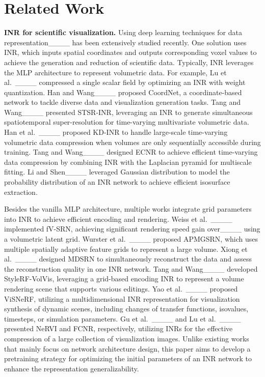 \section{Related Work}
\vspace{-0.025in}

{\bf INR for scientific visualization.}
Using deep learning techniques for data representation____ has been extensively studied recently. 
One solution uses INR, which inputs spatial coordinates and outputs corresponding voxel values to achieve the generation and reduction of scientific data. 
Typically, INR leverages the MLP architecture to represent volumetric data.
For example, Lu et al.\ ____ compressed a single scalar field by optimizing an INR with weight quantization.
Han and Wang____ proposed CoordNet, a coordinate-based network to tackle diverse data and visualization generation tasks.
Tang and Wang____ presented STSR-INR, leveraging an INR to generate simultaneous spatiotemporal super-resolution for time-varying multivariate volumetric data.
Han et al.\ ____ proposed KD-INR to handle large-scale time-varying volumetric data compression when volumes are only sequentially accessible during training.
Tang and Wang____ designed ECNR to achieve efficient time-varying data compression by combining INR with the Laplacian pyramid for multiscale fitting.
Li and Shen____ leveraged Gaussian distribution to model the probability distribution of an INR network to achieve efficient isosurface extraction.

Besides the vanilla MLP architecture, multiple works integrate grid parameters into INR to achieve efficient encoding and rendering.
Weiss et al.\ ____ implemented fV-SRN, achieving significant rendering speed gain over____ using a volumetric latent grid.
Wurster et al.\ ____ proposed APMGSRN, which uses multiple spatially adaptive feature grids to represent a large volume.
Xiong et al.\ ____ designed MDSRN to simultaneously reconstruct the data and assess the reconstruction quality in one INR network.
Tang and Wang____ developed StyleRF-VolVis, leveraging a grid-based encoding INR to represent a volume rendering scene that supports various editings.
Yao et al.\ ____ proposed ViSNeRF, utilizing a multidimensional INR representation for visualization synthesis of dynamic scenes, including changes of transfer functions, isovalues, timesteps, or simulation parameters. 
Gu et al.\ ____ and Lu et al.\ ____ presented NeRVI and FCNR, respectively, utilizing INRs for the effective compression of a large collection of visualization images. 
%
Unlike existing works that mainly focus on network architecture design, this paper aims to develop a pretraining strategy for optimizing the initial parameters of an INR network to enhance the representation generalizability.

